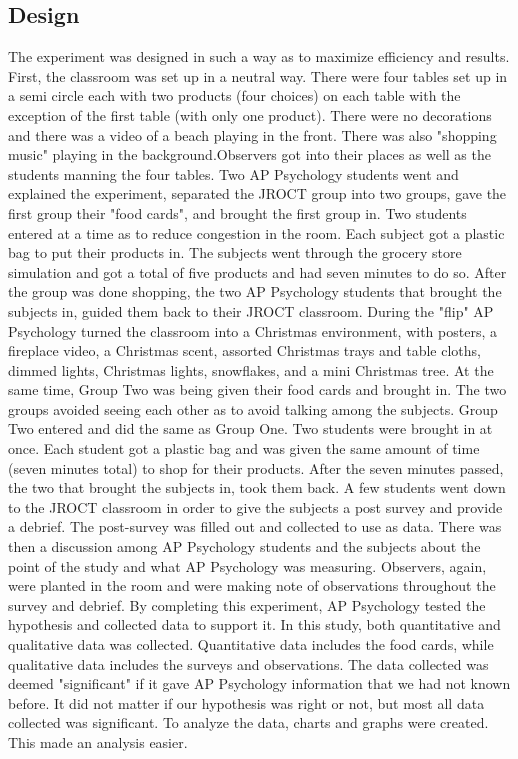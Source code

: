 \documentclass[twoside]{article}
\begin{document}
\begin{multicols}{2}
\subsection{Design}
The experiment was designed in such a way as to maximize efficiency and results. First, the classroom was set up in a neutral way. There were four tables set up in a semi circle each with two products (four choices) on each table with the exception of the first table (with only one product). There were no decorations and there was a video of a beach playing in the front. There was also "shopping music" playing in the background.Observers got into their places as well as the students manning the four tables. Two AP Psychology students went and explained the experiment, separated the JROCT group into two groups, gave the first group their "food cards", and brought the first group in. Two students entered at a time as to reduce congestion in the room. Each subject got a plastic bag to put their products in. The subjects went through the grocery store simulation and got a total of five products and had seven minutes to do so. After the group was done shopping, the two AP Psychology students that brought the subjects in, guided them back to their JROCT classroom. During the "flip" AP Psychology turned the classroom into a Christmas environment, with posters, a fireplace video, a Christmas scent, assorted Christmas trays and table cloths,
dimmed lights, Christmas lights,
snowflakes, and a mini Christmas tree. At the same time, Group Two was being given their food cards and brought in. The two groups avoided seeing each other as to avoid talking among the subjects. Group Two entered and did the same as Group One. Two students were brought in at once. Each student got a plastic bag and was given the same amount of time (seven minutes total) to shop for their products. After the seven minutes passed, the two that brought the subjects in, took them back. A few students went down to the JROCT classroom in order to give the subjects a post survey and provide a debrief. The post-survey was filled out and collected to use as data. There was then a discussion among AP Psychology students and the subjects about the point of the study and what AP Psychology was measuring. Observers, again, were planted in the room and were making note of observations throughout the survey and debrief. By completing this experiment, AP Psychology tested the hypothesis and collected data to support it. In this study, both quantitative and qualitative data was collected. Quantitative data includes the food cards, while qualitative data includes the surveys and observations. The data collected was deemed "significant" if it gave AP Psychology information that we had not known before. It did not matter if our hypothesis was right or not, but most all data collected was significant. To analyze the data, charts and graphs were created. This made an analysis easier.

\end{multicols}
\end{document}
